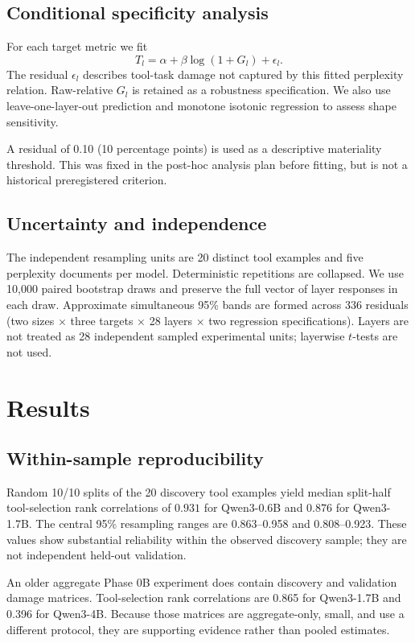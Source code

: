 \documentclass[10pt,twocolumn]{article}
\begin{document}
\subsection{Conditional specificity analysis}
For each target metric we fit
\begin{equation}
T_l=\alpha+\beta\log(1+G_l)+\epsilon_l.
\end{equation}
The residual $\epsilon_l$ describes tool-task damage not captured by this fitted perplexity relation. Raw-relative $G_l$ is retained as a robustness specification. We also use leave-one-layer-out prediction and monotone isotonic regression to assess shape sensitivity.

A residual of 0.10 (10 percentage points) is used as a descriptive materiality threshold. This was fixed in the post-hoc analysis plan before fitting, but is not a historical preregistered criterion.

\subsection{Uncertainty and independence}
The independent resampling units are 20 distinct tool examples and five perplexity documents per model. Deterministic repetitions are collapsed. We use 10,000 paired bootstrap draws and preserve the full vector of layer responses in each draw. Approximate simultaneous 95\% bands are formed across 336 residuals (two sizes $\times$ three targets $\times$ 28 layers $\times$ two regression specifications). Layers are not treated as 28 independent sampled experimental units; layerwise $t$-tests are not used.

\section{Results}
\subsection{Within-sample reproducibility}
Random 10/10 splits of the 20 discovery tool examples yield median split-half tool-selection rank correlations of $0.931$ for Qwen3-0.6B and $0.876$ for Qwen3-1.7B. The central 95\% resampling ranges are 0.863--0.958 and 0.808--0.923. These values show substantial reliability within the observed discovery sample; they are not independent held-out validation.

An older aggregate Phase 0B experiment does contain discovery and validation damage matrices. Tool-selection rank correlations are 0.865 for Qwen3-1.7B and 0.396 for Qwen3-4B. Because those matrices are aggregate-only, small, and use a different protocol, they are supporting evidence rather than pooled estimates.
\end{document}
